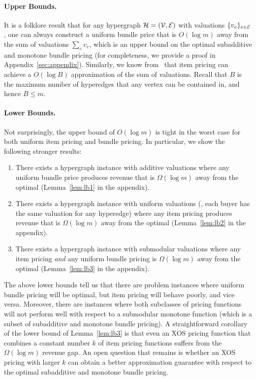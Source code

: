 \paragraph{Upper Bounds.}
It is a folklore result that for any hypergraph $\mathcal{H} = (\mathcal{V}, \mathcal{E})$ with valuations $\{v_e\}_{e \in \mathcal{E}}$, one can always construct a uniform bundle price that is $O(\log m)$ away from
the sum of valuations $\sum_e v_e$, which is an upper bound on the optimal subadditive and monotone bundle pricing (for completeness, we provide a proof in Appendix~\ref{sec:appendix}). Similarly, we know from~\cite{cheung2008approximation} that item pricing can achieve a $O(\log B)$ approximation of the sum of valuations. Recall that 
$B$ is the maximum number of hyperedges that any vertex can be contained in, and hence $B \leq m$. 

\paragraph{Lower Bounds.}
Not surprisingly, the upper bound of $O(\log m)$ is tight in the worst case for both uniform item pricing and bundle pricing. In particular, we show the following stronger results:
%
\begin{enumerate}
\item There exists a hypergraph instance with additive valuations where any uniform bundle price produces revenue that is $\Omega(\log m)$ away from the optimal (Lemma~\ref{lem:lb1} in the appendix).
\item There exists a hypergraph instance with uniform valuations (\ie, each buyer has the same valuation for any hyperedge) where any item pricing produces revenue that is $\Omega(\log m)$ away from the optimal (Lemma~\ref{lem:lb2} in the appendix).
\item There exists a hypergraph instance with submodular valuations where any item pricing {\em and} any uniform bundle pricing is  $\Omega(\log m)$ away from the optimal (Lemma~\ref{lem:lb3} in the appendix).
\end{enumerate} 

The above lower bounds tell us that there are problem instances where uniform bundle pricing will be optimal, but item pricing will behave poorly, and vice versa. Moreover, there are instances where both subclasses of pricing functions will not perform well with respect to a submodular monotone function (which is a subset of subadditive and monotone bundle pricing).
 A straightforward corollary of the lower bound of Lemma~\ref{lem:lb3} is that even an XOS pricing function that combines a constant number $k$ of item pricing functions suffers from the 
 $\Omega(\log m)$ revenue gap. An open question that remains is whether an XOS pricing with larger $k$ can obtain a better approximation guarantee with respect to the optimal subadditive and monotone bundle pricing.



